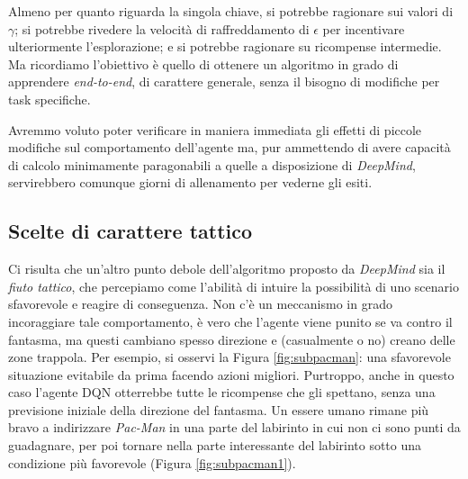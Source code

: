 \documentclass[twoside,twocolumn,10pt]{extarticle}
\theoremstyle{definition}
\begin{document}
		Almeno per quanto riguarda la singola chiave, si potrebbe ragionare sui valori di $\gamma$; si potrebbe rivedere la velocità di raffreddamento di $\epsilon$ per incentivare ulteriormente l'esplorazione; e si potrebbe ragionare su ricompense intermedie. Ma ricordiamo l'obiettivo è quello di ottenere un algoritmo in grado di apprendere \textit{end-to-end}, di carattere generale, senza il bisogno di modifiche per task specifiche.
		
		Avremmo voluto poter verificare in maniera immediata gli effetti di piccole modifiche sul comportamento dell'agente ma, pur ammettendo di avere capacità di calcolo minimamente paragonabili a quelle a disposizione di \textit{DeepMind}, servirebbero comunque giorni di allenamento per vederne gli esiti.

	\subsection{Scelte di carattere tattico}
		Ci risulta che un'altro punto debole dell'algoritmo proposto da \textit{DeepMind} sia il \textit{fiuto tattico}, che percepiamo come l'abilità di intuire la possibilità di uno scenario sfavorevole e reagire di conseguenza. Non c'è un meccanismo in grado incoraggiare tale comportamento, è vero che l'agente viene punito se va contro il fantasma, ma questi cambiano spesso direzione e (casualmente o no) creano delle zone trappola. Per esempio, si osservi la Figura \ref{fig:subpacman}: una sfavorevole situazione evitabile da prima facendo azioni migliori. Purtroppo, anche in questo caso l'agente DQN otterrebbe tutte le ricompense che gli spettano, senza una previsione iniziale della direzione del fantasma. Un essere umano rimane più bravo a indirizzare \textit{Pac-Man} in una parte del labirinto in cui non ci sono punti da guadagnare, per poi tornare nella parte interessante del labirinto sotto una condizione più favorevole (Figura \ref{fig:subpacman1}).
		
\end{document}
